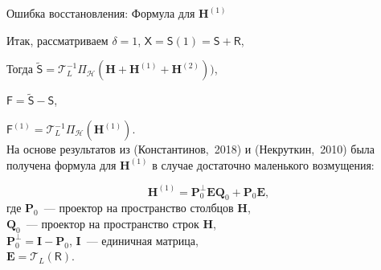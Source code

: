 \documentclass[ucs, notheorems, handout]{beamer}
\newcommand{\tX}[1]{\mathsf{#1}}
\begin{document}
\begin{frame}{Ошибка восстановления: Формула для $\mathbf{H}^{(1)}$}

Итак, рассматриваем $\delta = 1$,
$\tX{X} = \tX{S}(1) = \tX{S} + \tX{R}$,

Тогда
$\tilde{\tX{S}} = \mathcal{T}_L^{-1} \Pi_{\mathcal{H}} (\mathbf{H} + \mathbf{H}^{(1)} + \mathbf{H}^{(2)}))$,

$\tX{F} = \tilde{\tX{S}} - \tX{S}$,

$\tX{F}^{(1)} = \mathcal{T}_L^{-1} \Pi_{\mathcal{H}}(\mathbf{H}^{(1)})$.\\
\vspace{1em}
На основе результатов из (Константинов,~2018) и (Некруткин,~2010) была получена формула для $\mathbf{H}^{(1)}$ в случае достаточно маленького возмущения:

\begin{equation*} \label{eq:main}
	\mathbf{H}^{(1)} = \mathbf{P}^{\perp}_0 \mathbf{E} \mathbf{Q}_0 + \mathbf{P}_0 \mathbf{E},
\end{equation*}
где $\mathbf{P}_0$~--- проектор на пространство столбцов $\mathbf{H}$, \\$\mathbf{Q}_0$~--- проектор на пространство строк $\mathbf{H}$,\\ $\mathbf{P}^{\perp}_0 = \mathbf{I} - \mathbf{P}_0$, $\mathbf{I}$~--- единичная матрица,\\
$\mathbf{E} = \mathcal{T}_L(\tX{R})$.

\end{frame}
\end{document}
